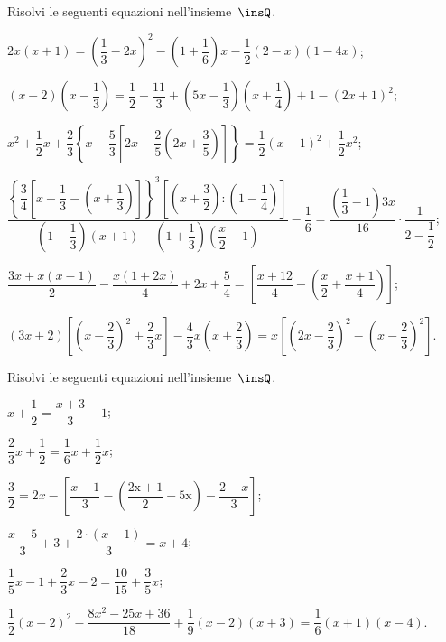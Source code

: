\begin{esercizio}[\Ast] %
\label{ese:15.41}
Risolvi le seguenti equazioni nell'insieme~$\insQ$.
\begin{enumeratea}
 \item $2x(x+1)=\left(\dfrac{1}{3}-2x\right)^{2}-\left(1+\dfrac{1}{6}\right)x-\dfrac{1}{2}(2-x)(1-4x)$;
 \item $(x+2)\left(x-\dfrac{1}{3}\right)=\dfrac{1}{2}+\dfrac{11}{3}+\left(5x-\dfrac{1}{3}\right)\left(x+\dfrac{1}{4}\right)+1-(2x+1)^{2}$;
 \item $x^{2}+\dfrac{1}{2}x+\dfrac{2}{3}\left\lbrace x-\dfrac{5}{3}\left[2x-\dfrac{2}{5}\left(2x+\dfrac{3}{5}\right)\right] \right\rbrace=\dfrac{1}{2}(x-1)^{2}+\dfrac{1}{2}x^{2}$;
 \item $\dfrac{\left\lbrace\dfrac{3}{4}\left[x-\dfrac{1}{3}-\left(x+\dfrac{1}{3}\right)\right]\right\rbrace^{3}\left[\left(x+\dfrac{3}{2}\right):\left(1-\dfrac{1}{4}\right)\right]}{\left(1-\dfrac{1}{3}\right)(x+1)-\left(1+\dfrac{1}{3}\right)\left(\dfrac{x}{2}-1\right)}-\dfrac{1}{6}=\dfrac{\left(\dfrac{1}{3}-1\right)3x}{16}\cdot\dfrac{1}{2-\dfrac{1}{2}}$;
 \item $\dfrac{3x+x(x-1)}{2}-\dfrac{x(1+2x)}{4}+2x+\dfrac{5}{4}=\left[\dfrac{x+12}{4}-\left(\dfrac{x}{2}+\dfrac{x+1}{4}\right)\right]$;
 \item $(3x+2)\left[\left(x-\dfrac{2}{3}\right)^{2}+\dfrac{2}{3}x\right]-\dfrac{4}{3}x\left(x+\dfrac{2}{3}\right)=x\left[\left(2x-\dfrac{2}{3}\right)^{2}-\left(x-\dfrac{2}{3}\right)^{2}\right]$.
\end{enumeratea}
\end{esercizio}

\begin{esercizio}
\label{ese:15.42}
Risolvi le seguenti equazioni nell'insieme~$\insQ$.
\begin{enumeratea}
 \item $x+\dfrac{1}{2}=\dfrac{x+3}{3}-1$;
 \item $\dfrac{2}{3}x+\dfrac{1}{2}=\dfrac{1}{6}x+\dfrac{1}{2}x$;
 \item $\dfrac{3}{2}=2x-\left[\dfrac{x-1}{3}-\left(\dfrac{\text{2x}+1}{2}-\text{5x}\right)-\dfrac{2-x}{3}\right]$;
 \item $\dfrac{x+5}{3}+3+\dfrac{2\cdot \left(x-1\right)}{3}=x+4$;
 \item $\dfrac{1}{5}x-1+\dfrac{2}{3}x-2=\dfrac{10}{15}+\dfrac{3}{5}x$;
 \item $\dfrac{1}{2}(x-2)^{2}-\dfrac{8x^{2}-25x+36}{18}+\dfrac{1}{9}(x-2)(x+3)=\dfrac{1}{6}(x+1)(x-4)$.
\end{enumeratea}
\end{esercizio}

